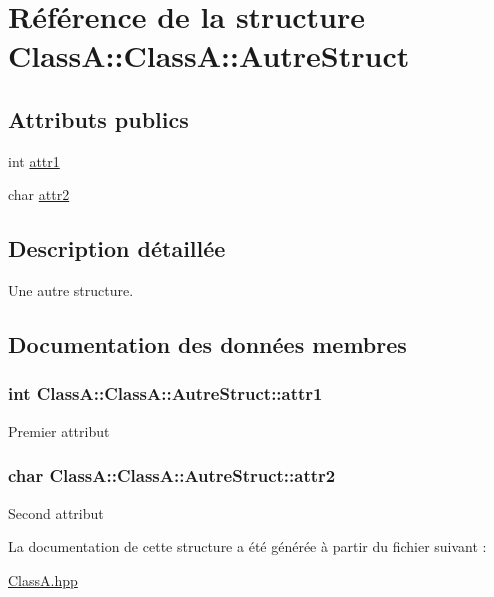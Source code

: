 \hypertarget{struct_class_a_1_1_autre_struct}{
\section{Référence de la structure ClassA::ClassA::AutreStruct}
\label{struct_class_a_1_1_autre_struct}
}
\subsection*{Attributs publics}
\begin{CompactItemize}
\item 
int \hyperlink{struct_class_a_1_1_autre_struct_bd2379d24d801d04d3e2cb3033afb3f0}{attr1}
\item 
char \hyperlink{struct_class_a_1_1_autre_struct_5398cc7df47efcd87a9a9bf23d220be1}{attr2}
\end{CompactItemize}


\subsection{Description détaillée}
Une autre structure. 

\subsection{Documentation des données membres}
\hypertarget{struct_class_a_1_1_autre_struct_bd2379d24d801d04d3e2cb3033afb3f0}{
\subsubsection[{attr1}]{\setlength{\rightskip}{0pt plus 5cm}int ClassA::ClassA::AutreStruct::attr1}}
\label{struct_class_a_1_1_autre_struct_bd2379d24d801d04d3e2cb3033afb3f0}


Premier attribut \hypertarget{struct_class_a_1_1_autre_struct_5398cc7df47efcd87a9a9bf23d220be1}{
\subsubsection[{attr2}]{\setlength{\rightskip}{0pt plus 5cm}char ClassA::ClassA::AutreStruct::attr2}}
\label{struct_class_a_1_1_autre_struct_5398cc7df47efcd87a9a9bf23d220be1}


Second attribut 

La documentation de cette structure a été générée à partir du fichier suivant :\begin{CompactItemize}
\item 
\hyperlink{_class_a_8hpp}{ClassA.hpp}\end{CompactItemize}
